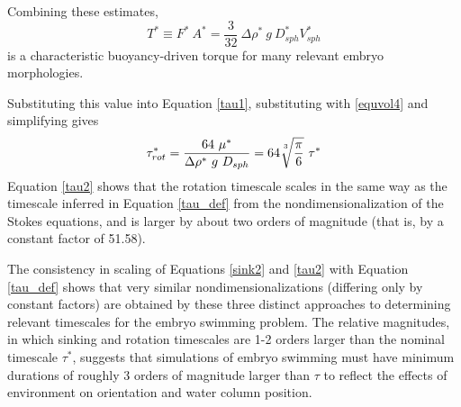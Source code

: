 \documentclass[10pt,a4paper]{article}
\def\non{\nonumber}
\begin{document}
Combining these estimates,
\begin{equation}\label{charT}
	T^* \equiv F^* ~ A^* = \frac{3}{32} ~ \Delta \rho^* ~ g ~ D_{sph}^* V_{sph}^* 
\end{equation}
is a characteristic buoyancy-driven torque for many relevant embryo morphologies.
% 
%

Substituting this value into Equation \ref{tau1}, substituting with \ref{equvol4} and simplifying gives
\begin{equation}\label{tau2}
	\tau^*_{rot} = \frac{64 ~ \mu^*}{\Delta \rho^* ~ g ~ D_{sph}} 
	=  64\sqrt[\uproot{5}3]{\frac{\pi}{6}} ~ \tau^*
\end{equation}
Equation \ref{tau2} shows that the rotation timescale scales in the same way as the timescale inferred in Equation \ref{tau_def} from the nondimensionalization of the Stokes equations, and is larger by about two orders of magnitude (that is, by a constant factor of 51.58).

The consistency in scaling of Equations \ref{sink2} and \ref{tau2} with Equation \ref{tau_def} shows that very similar nondimensionalizations (differing only by constant factors) are obtained by these three distinct approaches to determining relevant timescales for the embryo swimming problem.
The relative magnitudes, in which sinking and rotation timescales are 1-2 orders larger than the nominal timescale $\tau^*$, suggests that simulations of embryo swimming must have minimum durations of roughly 3 orders of magnitude larger than $\tau$ to reflect the effects of environment on orientation and water column position.
\end{document}
